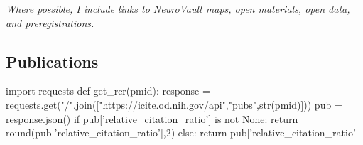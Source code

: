 \documentclass[11pt, letterpaper]{article}
\begin{document}
\textit{Where possible, I include links to \href{https://neurovault.org}{NeuroVault} maps, open materials, open data, and preregistrations.}

\subsection*{Publications}

\begin{pycode}
import requests
def get_rcr(pmid):
  response = requests.get("/".join(["https://icite.od.nih.gov/api","pubs",str(pmid)]))
  pub = response.json()
  if pub['relative_citation_ratio'] is not None:
    return round(pub['relative_citation_ratio'],2)
  else:
    return pub['relative_citation_ratio']
\end{pycode}
\end{document}
